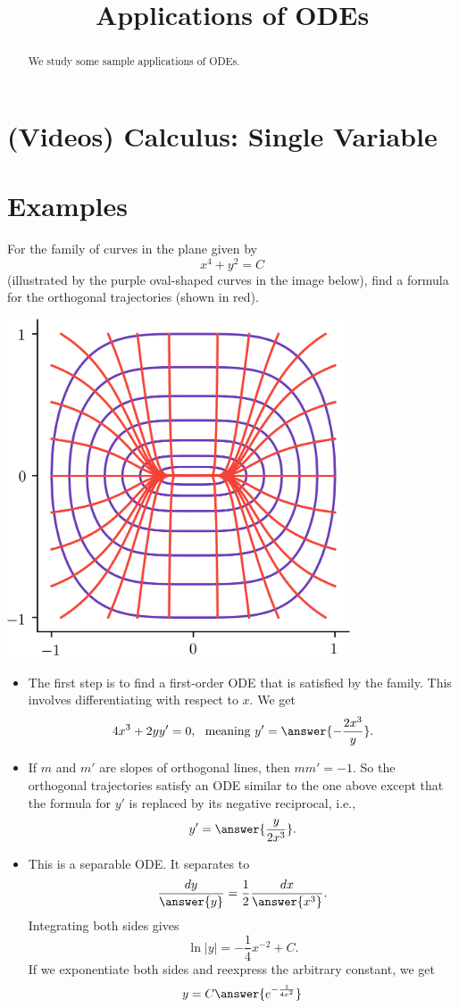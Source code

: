 \documentclass{ximera}
\title{Applications of ODEs}
\begin{document}
\begin{abstract}
We study some sample applications of ODEs.
\end{abstract}
\maketitle

\section*{(Videos) Calculus: Single Variable}

\section*{Examples}
For the family of curves in the plane given by 
\[ x^4 + y^2 = C \]
(illustrated by the purple oval-shaped curves in the image below), 
find a formula for the orthogonal trajectories (shown in red).
\begin{center}
\begin{image}
\includegraphics[width=4in]{images/slopeX01.png}
\end{image}
\end{center}
\begin{itemize}
\item The first step is to find a first-order ODE that is satisfied by the family. This involves differentiating with respect to $x$. We get
\[ 4 x^3 + 2y y' = 0, \ \text{ meaning } y' = \answer{-\frac{2x^3}{y}}. \]
\item If $m$ and $m'$ are slopes of orthogonal lines, then $m m' = -1$. So the orthogonal trajectories satisfy an ODE similar to the one above except that the formula for $y'$ is replaced by its negative reciprocal, i.e.,
\[ y' = \answer{\frac{y}{2x^3}}. \]
\item This is a separable ODE. It separates to
\[ \frac{dy}{\answer{y}} = \frac{1}{2} \frac{dx}{\answer{x^3}}. \]
Integrating both sides gives
\[ \ln |y| = - \frac{1}{4} x^{-2} + C. \]
If we exponentiate both sides and reexpress the arbitrary constant, we get
\[ y = C \answer{e^{-\frac{1}{4x^2}}} \]
\end{itemize}
\end{document}
